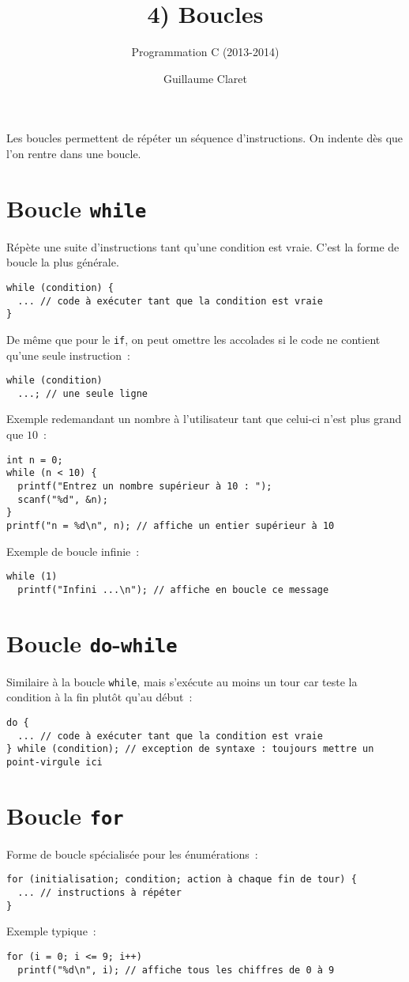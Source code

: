 \documentclass[a4paper,10pt]{article}
\begin{document}
  \title{4) Boucles}
  \author{Programmation C (2013-2014)}
  \date{Guillaume Claret}
  \maketitle
  
  Les boucles permettent de répéter un séquence d'instructions. On indente dès que l'on rentre dans une boucle.
  
  \section{Boucle \texttt{while}}
  Répète une suite d'instructions tant qu'une condition est vraie. C'est la forme de boucle la plus générale.
  \begin{verbatim}
while (condition) {
  ... // code à exécuter tant que la condition est vraie
}
  \end{verbatim}
  De même que pour le \texttt{if}, on peut omettre les accolades si le code ne contient qu'une seule instruction~:
  \begin{verbatim}
while (condition)
  ...; // une seule ligne
  \end{verbatim}
  Exemple redemandant un nombre à l'utilisateur tant que celui-ci n'est plus grand que $10$~:
  \begin{verbatim}
int n = 0;
while (n < 10) {
  printf("Entrez un nombre supérieur à 10 : ");
  scanf("%d", &n);
}
printf("n = %d\n", n); // affiche un entier supérieur à 10
  \end{verbatim}
  Exemple de boucle infinie~:
  \begin{verbatim}
while (1)
  printf("Infini ...\n"); // affiche en boucle ce message
  \end{verbatim}
  
  \section{Boucle \texttt{do}-\texttt{while}}
  Similaire à la boucle \texttt{while}, mais s'exécute au moins un tour car teste la condition à la fin plutôt qu'au début~:
  \begin{verbatim}
do {
  ... // code à exécuter tant que la condition est vraie
} while (condition); // exception de syntaxe : toujours mettre un point-virgule ici
  \end{verbatim}
  
  \section{Boucle \texttt{for}}
  Forme de boucle spécialisée pour les énumérations~:
  \begin{verbatim}
for (initialisation; condition; action à chaque fin de tour) {
  ... // instructions à répéter
}
  \end{verbatim}
  Exemple typique~:
  \begin{verbatim}
for (i = 0; i <= 9; i++)
  printf("%d\n", i); // affiche tous les chiffres de 0 à 9
  \end{verbatim}
  
\end{document}
